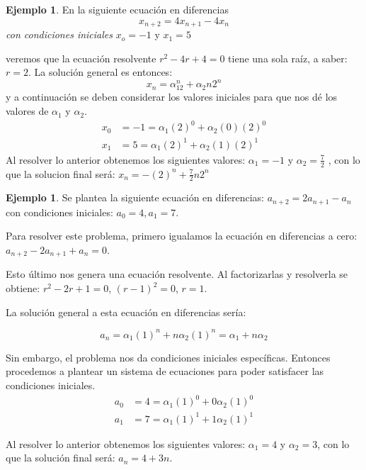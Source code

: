 \documentclass{report}
\theoremstyle{definition}
\newtheorem{ejemplo}[teorema]{Ejemplo}
\begin{document}
\begin{ejemplo}
En la siguiente ecuación en diferencias
\begin{equation}
  \label{eq:1}
  x_{n+2}=4x_{n+1}-4x_{n}  
\end{equation}
\textit{con condiciones iniciales} $x_o=-1$ y $x_1=5$

veremos que la ecuación resolvente $r^2-4r+4=0$ tiene una sola raíz, a
saber: $r=2$.
La solución general es entonces:
$$x_n=\alpha_12^n+\alpha_2n2^n$$
y a continuación se deben considerar los valores iniciales para que
nos dé los valores de $\alpha_1$ y $\alpha_2$.
\begin{align*}
  x_{0}&=-1=\alpha_{1}(2)^0+\alpha_{2}(0)(2)^0\\
  x_{1}&=5=\alpha_{1}(2)^1+\alpha_{2}(1)(2)^1
\end{align*}
Al resolver lo anterior obtenemos los siguientes valores: $\alpha_{1}=-1$ y $\alpha_{2}=\frac{7}{2}$ , con lo que la solucion final será: $x_n=-(2)^n+\frac{7}{2}n2^n$ 

\end{ejemplo}

\begin{ejemplo}

Se plantea la siguiente ecuación en diferencias:
$a_{n+2}=2a_{n+1}-a_{n}$ con condiciones iniciales: $a_{0}=4, a_{1}=7$.

Para resolver este problema, primero igualamos la ecuación en diferencias a
cero: $a_{n+2}-2a_{n+1}+a_{n}=0$.

Esto último nos genera una ecuación resolvente. Al factorizarlas y
resolverla se obtiene: $r^2-2r+1=0$, $(r-1)^2=0$, ${r=1}$.

La solución general a esta ecuación en diferencias sería:



$$a_{n}=\alpha_{1}(1)^n+n\alpha_{2}(1)^n=\alpha_{1}+n\alpha_{2}$$

Sin embargo, el problema nos da condiciones iniciales
específicas. Entonces procedemos a plantear un sistema de ecuaciones
para poder satisfacer las condiciones iniciales.
\begin{align*}
  a_{0}&=4=\alpha_{1}(1)^0+0\alpha_{2}(1)^0\\
  a_{1}&=7=\alpha_{1}(1)^1+1\alpha_{2}(1)^1
\end{align*}

Al resolver lo anterior obtenemos los siguientes valores:
$\alpha_{1}=4$ y $\alpha_{2}=3$, con lo que la solución final será:
$a_{n}=4+3n$.
\end{ejemplo}
\end{document}
